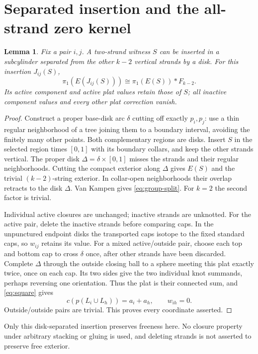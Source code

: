 \documentclass[11pt]{article}
\newtheorem{lemma}[theorem]{Lemma}
\theoremstyle{remark}\newtheorem{remark}[theorem]{Remark}
\begin{document}
\section{Separated insertion and the all-strand zero kernel}
\begin{lemma}\label{lem:insertion}
Fix a pair $i,j$. A two-strand witness $S$ can be inserted in a subcylinder
separated from the other $k-2$ vertical strands by a disk. For this insertion
$J_{ij}(S)$,
\begin{equation}\label{eq:group-split}
\pi_1(E(J_{ij}(S)))\cong\pi_1(E(S))*F_{k-2}.
\end{equation}
Its active component and active plat values retain those of $S$; all
inactive component values and every other plat correction vanish.
\end{lemma}
\begin{proof}
Construct a proper base-disk arc $\delta$ cutting off exactly $p_i,p_j$:
use a thin regular neighborhood of a tree joining them to a boundary
interval, avoiding the finitely many other points. Both complementary
regions are disks. Insert $S$ in the selected region times $[0,1]$ with
its boundary collars, and keep the other strands vertical. The proper disk
$\Delta=\delta\times[0,1]$ misses the strands and their regular neighborhoods.
Cutting the compact exterior along $\Delta$ gives $E(S)$ and the trivial
$(k-2)$-string exterior. In collar-open neighborhoods their overlap retracts
to the disk $\Delta$. Van Kampen gives \eqref{eq:group-split}. For $k=2$ the
second factor is trivial.

Individual active closures are unchanged; inactive strands are unknotted.
For the active pair, delete the inactive strands before comparing caps.
In the unpunctured endpoint disks the transported caps isotope to the fixed
standard caps, so $w_{ij}$ retains its value. For a mixed active/outside pair,
choose each top and bottom cap to cross $\delta$ once, after other strands
have been discarded. Complete $\Delta$ through the outside closing ball
to a sphere meeting this plat exactly twice, once on each cap. Its two sides
give the two individual knot summands, perhaps reversing one orientation.
Thus the plat is their connected sum, and \eqref{eq:square} gives
\[
c(p(L_i\cup L_h))=a_i+a_h,\qquad w_{ih}=0.
\]
Outside/outside pairs are trivial. This proves every coordinate asserted.
\end{proof}
Only this disk-separated insertion preserves freeness here. No closure
property under arbitrary stacking or gluing is used, and deleting strands
is not asserted to preserve free exterior.
\end{document}

